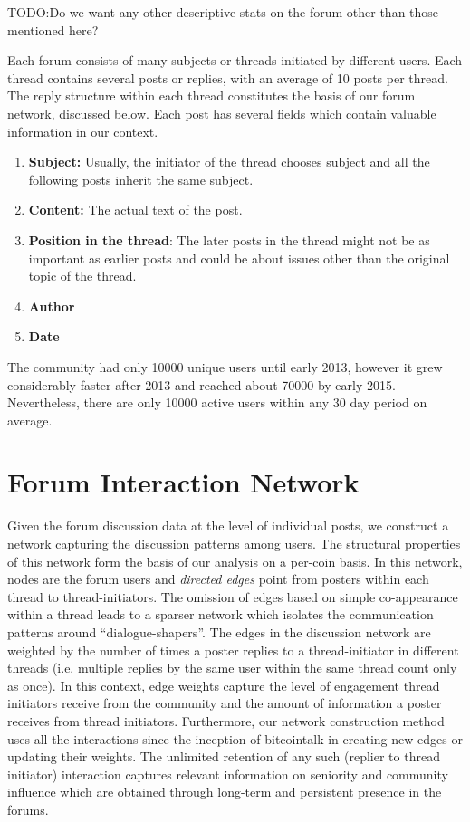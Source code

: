 TODO:Do we want any other descriptive stats on the forum other than those mentioned here? 

Each forum consists of many subjects or threads initiated by different users.
Each thread contains several posts or replies, with an average of 10 posts per
thread.  The reply structure within each thread constitutes the basis of our
forum network, discussed below.  Each post has several fields which contain
valuable information in our context.
\begin{enumerate}[topsep=0pt,itemsep=-0.5ex,partopsep=1ex,parsep=1ex]
  \item \textbf{Subject:} Usually, the initiator of the thread chooses subject and all the
    following posts inherit the same subject.
  \item \textbf{Content:} The actual text of the post.
  \item \textbf{Position in the thread}: The later posts in the thread might not be as important
    as earlier posts and could be about issues other than the original topic of the thread.
  \item \textbf{Author}
  \item \textbf{Date}
\end{enumerate}
The community had only 10000 unique users until early 2013, however it grew considerably faster after 2013 and reached about 70000 by early 2015.
Nevertheless, there are only 10000 active users within any 30 day period on average.

\section{Forum Interaction Network}

Given the forum discussion data at the level of individual posts, we  construct a network capturing the discussion patterns among users. The structural properties of this network form the basis of our analysis on a per-coin basis. In this network, nodes are the forum users and \textit{directed edges} point from posters within each thread to thread-initiators. The omission of edges based on simple co-appearance within a thread leads to a sparser network which isolates the communication patterns around ``dialogue-shapers''. The edges in the discussion network are weighted by the number of times a poster replies to a thread-initiator in different threads (i.e. multiple replies by the same user within the same thread count only as once).
In this context, edge weights capture the level of engagement thread initiators receive from the community and the amount of information a poster receives from thread initiators. Furthermore, our network construction method uses all the interactions since the inception of bitcointalk in creating new edges or updating their weights. The unlimited retention of any such (replier to thread initiator) interaction captures relevant information on seniority and community influence which are obtained through long-term and persistent presence in the forums. 

